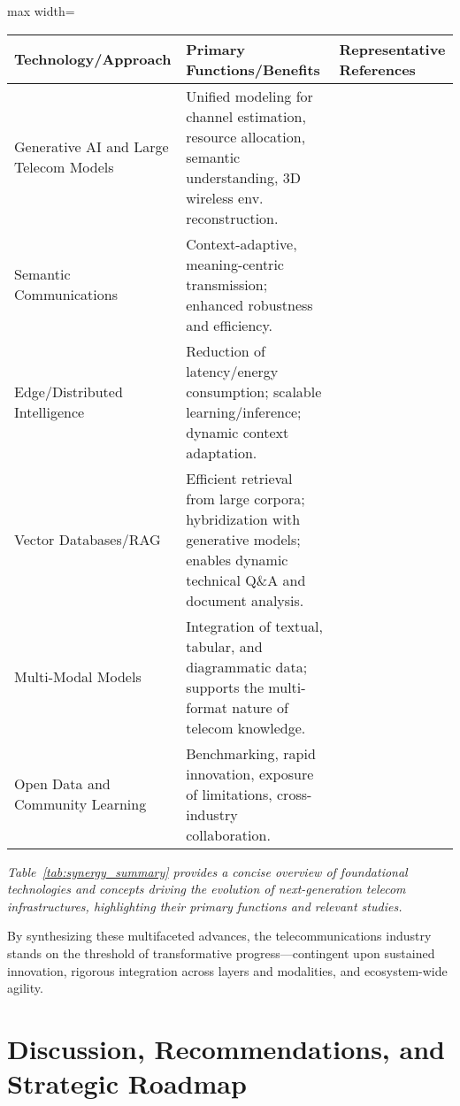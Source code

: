\documentclass[sigconf]{acmart}
\begin{document}
\begin{table*}[htbp]
\centering
\caption{Summary of Key Synergistic Technologies and Their Roles in Next-Gen Telecom}
\label{tab:synergy_summary}
\begin{adjustbox}{max width=\textwidth}
\begin{tabular}{lll}
\toprule
\textbf{Technology/Approach} & \textbf{Primary Functions/Benefits} & \textbf{Representative References} \\
\midrule
Generative AI and Large Telecom Models  & Unified modeling for channel estimation, resource allocation, semantic understanding, 3D wireless env. reconstruction. & \cite{ref24,ref20,ref26} \\
Semantic Communications   & Context-adaptive, meaning-centric transmission; enhanced robustness and efficiency. & \cite{ref20,ref26} \\
Edge/Distributed Intelligence & Reduction of latency/energy consumption; scalable learning/inference; dynamic context adaptation. & \cite{ref12,ref14,ref19,ref21,ref25} \\
Vector Databases/RAG  & Efficient retrieval from large corpora; hybridization with generative models; enables dynamic technical Q\&A and document analysis. & \cite{ref11,ref22,ref23,ref29} \\
Multi-Modal Models  & Integration of textual, tabular, and diagrammatic data; supports the multi-format nature of telecom knowledge. & \cite{ref21,ref29} \\
Open Data and Community Learning & Benchmarking, rapid innovation, exposure of limitations, cross-industry collaboration. & \cite{ref11,ref21,ref22,ref23} \\
\bottomrule
\end{tabular}
\end{adjustbox}
\end{table*}

\textit{Table~\ref{tab:synergy_summary} provides a concise overview of foundational technologies and concepts driving the evolution of next-generation telecom infrastructures, highlighting their primary functions and relevant studies.}

\vspace{2em}
\noindent
By synthesizing these multifaceted advances, the telecommunications industry stands on the threshold of transformative progress—contingent upon sustained innovation, rigorous integration across layers and modalities, and ecosystem-wide agility.

\section{Discussion, Recommendations, and Strategic Roadmap}
\end{document}
